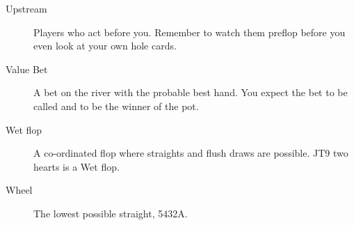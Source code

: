 \begin{description}
\item[Upstream] Players who act before you. Remember to watch them
preflop before you even look at your own hole cards.

\item[Value Bet] A bet on the river with the probable best hand. You
expect the bet to be called and to be the winner of the pot.

\item[Wet flop] A co-ordinated flop where straights and flush draws
are possible. JT9 two hearts is a Wet flop.

\item[Wheel] The lowest possible straight, 5432A.

\end{description}
